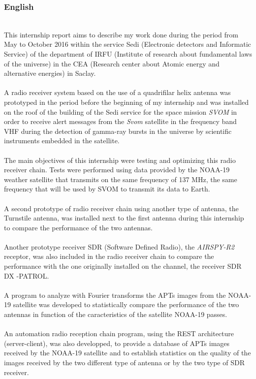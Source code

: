 \documentclass[12pt,fleqn]{book} %
\begin{document}
\subsubsection{English}
~\\\indent This internship report aims to describe my work done during the period from May to October 2016 within the service Sedi (Electronic detectors and Informatic Service) of the department of IRFU (Institute of research about fundamental laws of the universe) in the CEA (Research center about Atomic energy and alternative energies) in Saclay.
~\\\\A radio receiver system based on the use of a quadrifilar helix antenna was prototyped in the period before the beginning of my internship and was installed on the roof of the building of the Sedi service for the space mission \emph{SVOM} in order to receive alert messages from the \emph{Svom} satellite in the frequency band VHF during the detection of gamma-ray bursts in the universe by scientific instruments embedded in the satellite.
~\\\\The main objectives of this internship were testing and optimizing this radio receiver chain. Tests were performed using data provided by the NOAA-19 weather satellite that transmits on the same frequency of 137 MHz, the same frequency that will be used by SVOM to transmit its data to Earth.
~\\\\A second prototype of radio receiver chain using another type of antenna, the Turnstile antenna, was installed next to the first antenna during this internship to compare the performance of the two antennas.
~\\\\Another prototype receiver SDR (Software Defined Radio), the \emph{AIRSPY-R2} receptor, was also included in the radio receiver chain to compare the performance with the one originally installed on the channel, the receiver SDR DX -PATROL.
~\\\\A program to analyze with Fourier transforms the APTs images from the NOAA-19 satellite was developed to statistically compare the performance of the two antennas in function of the caracteristics of the satellite NOAA-19 passes.
~ \\\\An automation radio reception chain program, using the REST architecture (server-client), was also developped, to provide a database of APTs images received by the NOAA-19 satellite and to establish statistics on the quality of the images received by the two different type of antenna or by the two type of SDR receiver.
\end{document}
